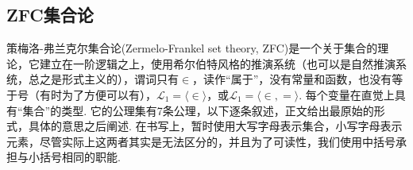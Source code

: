 \documentclass[main.tex]{subfiles}
\begin{document}
\subsection{\textsf{ZFC}集合论}

策梅洛-弗兰克尔集合论(Zermelo-Frankel set theory, \textsf{ZFC})是一个关于集合的理论，它建立在一阶逻辑之上，使用希尔伯特风格的推演系统（也可以是自然推演系统，总之是形式主义的），谓词只有\(\in\)，读作“属于”，没有常量和函数，也没有等于号（有时为了方便可以有），\(\mathcal{L}_1 = \langle \in \rangle\)，或\(\mathcal{L}_1 = \langle \in,= \rangle\). 每个变量在直觉上具有“集合”的类型. 它的公理集有7条公理，以下逐条叙述，正文给出最原始的形式，具体的意思之后阐述. 在书写上，暂时使用大写字母表示集合，小写字母表示元素，尽管实际上这两者其实是无法区分的，并且为了可读性，我们使用中括号承担与小括号相同的职能.
\end{document}
